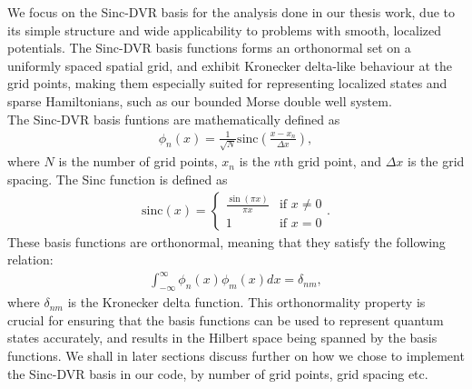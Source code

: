 \documentclass{subfiles}
\begin{document}
We focus on the Sinc-DVR basis \cite{colbert1992novel} for the analysis done in our thesis work, due to its simple structure and wide applicability to problems with smooth, localized potentials. The Sinc-DVR basis functions forms an orthonormal set on a uniformly spaced spatial grid, and exhibit Kronecker delta-like behaviour at the grid points, making them especially suited for representing localized states and sparse Hamiltonians, such as our bounded Morse double well system.
\\ The Sinc-DVR basis funtions are mathematically defined as
\begin{align*}
    \phi_n(x) = \frac{1}{\sqrt{N}} \text{sinc}\left(\frac{x - x_n}{\Delta x}\right)\label{eq:sinc_dvr},
\end{align*}
where $N$ is the number of grid points, $x_n$ is the $n$th grid point, and $\Delta x$ is the grid spacing. The Sinc function is defined as
\begin{align*}
    \text{sinc}(x) = \begin{cases}
        \frac{\sin(\pi x)}{\pi x} & \text{if } x \neq 0 \\
        1 & \text{if } x = 0
    \end{cases}.
\end{align*}
These basis functions are orthonormal, meaning that they satisfy the following relation:
\begin{align*}
    \int_{-\infty}^{\infty} \phi_n(x) \phi_m(x) dx = \delta_{nm},
\end{align*}
where $\delta_{nm}$ is the Kronecker delta function. This orthonormality property is crucial for ensuring that the basis functions can be used to represent quantum states accurately, and results in the Hilbert space being spanned by the basis functions. We shall in later sections discuss further on how we chose to implement the Sinc-DVR basis in our code, by number of grid points, grid spacing etc. 
\end{document}
